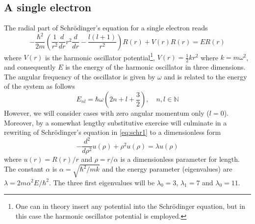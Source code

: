 \documentclass[10pt, a4paper]{amsart}
\begin{document}
\subsection{A single electron}
The radial part of Schrödinger's equation for a single electron reads
\begin{equation}
\label{eq:schr1}
-\frac{\hbar^2}{2m}\left(\frac{1}{r^2}\frac{d}{dr}r^2\frac{d}{dr}-\frac{l(l+1)}{r^2} \right)R(r) + V(r)R(r) = ER(r)
\end{equation}
where $V(r)$ is the harmonic oscillator potential\footnote{One can in theory insert any potential into the Schrödinger equation, but in this case the harmonic oscillator potential is employed.}, $V(r)=\frac{1}{2}kr^2$ where $k=m\omega^2$, and consequently $E$ is the energy of the harmonic oscillator in three dimensions. The angular frequency of the oscillator is given by $\omega$ and is related to the energy of the system as follows
\begin{equation}
E_{nl}=\hbar\omega\left(2n + l  + \frac{3}{2} \right), \quad n,l \in \mathbb{N} 
\end{equation}
However, we will consider cases with zero angular momentum only ($l=0$). Moreover, by a somewhat lengthy substitutive exercise will culminate in a rewriting of Schrödinger's equation in \ref{eq:schr1} to a dimensionless form
\begin{equation}
\label{eq:schr2}
-\frac{d^2}{d\rho^2}u(\rho) + \rho^2u(\rho) = \lambda u(\rho)
\end{equation}
where $u(r) = R(r)/r$ and $\rho = r/\alpha$ is a dimensionless parameter for length. The constant $\alpha$ is $\alpha = \sqrt{\hbar^2/mk}$ and the energy parameter (eigenvalues) are $\lambda = 2m\alpha^2E/\hbar^2$. The three first eigenvalues will be $\lambda_0= 3$, $\lambda_1 = 7$ and $\lambda_0=11$.
\end{document}
